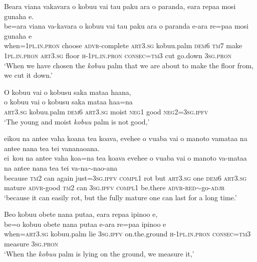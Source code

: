 \ea\label{ex:text15-9}
Beara viana vakavara o kobuu vai tau paku ara o paranda, eara repaa mosi gunaha e.\\
\gll be=ara	viana	va-kavara	o	kobuu	vai	tau	paku	ara	o	paranda	e-ara	re=paa	mosi	gunaha	e\\
     when=1\textsc{pl}.\textsc{in}.\textsc{pron}	choose	\textsc{advr}-complete	\textsc{art}3.\textsc{sg}	kobuu.palm	\textsc{dem}6	\textsc{tm}7	make	1\textsc{pl}.\textsc{in}.\textsc{pron}	\textsc{art}3.\textsc{sg}	floor	\textsc{h}-1\textsc{pl}.\textsc{in}.\textsc{pron}	\textsc{consec}=\textsc{tm}3	cut	go.down	3\textsc{sg}.\textsc{pron}\\
\glt `When we have chosen the \textit{kobuu} palm that we are about to make the floor from, we cut it down.'
\z

\ea\label{ex:text15-10}
O kobuu vai o kobusu saka mataa haana,\\
\gll o	kobuu	vai	o	kobusu	saka	mataa	haa=na\\
     \textsc{art}3.\textsc{sg}	kobuu.palm	\textsc{dem}6	\textsc{art}3.\textsc{sg}	moist	\textsc{neg}1	good	\textsc{neg}2=3\textsc{sg}.\textsc{ipfv}\\
\glt `The young and moist \textit{kobuu} palm is not good,'
\z

\ea\label{ex:text15-11}
eikou na antee vaha koana tea koava, evehee o vuaba vai o manoto vamataa na antee nana tea tei vananaoana.\\
\gll ei~kou	na	antee	vaha	koa=na	tea	koava	evehee	o	vuaba	vai	o	manoto	va-mataa	na	antee	nana	tea	tei	va-na{$\sim$}nao-ana\\
     because	\textsc{tm}2	can	again	just=3\textsc{sg}.\textsc{ipfv}	\textsc{compl}1	rot	but	\textsc{art}3.\textsc{sg}	one	\textsc{dem}6	\textsc{art}3.\textsc{sg}	mature	\textsc{advr}-good	\textsc{tm}2	can	3\textsc{sg}.\textsc{ipfv}	\textsc{compl}1	be.there	\textsc{advr}-\textsc{red}{$\sim$}go-\textsc{adjr}\\
\glt `because it can easily rot, but the fully mature one can last for a long time.'
\z

\ea\label{ex:text15-12}
Beo kobuu obete nana putaa, eara repaa ipinoo e,\\
\gll be=o	kobuu	obete	nana	putaa	e-ara	re=paa	ipinoo	e\\
     when=\textsc{art}3.\textsc{sg}	kobuu.palm	lie	3\textsc{sg}.\textsc{ipfv}	on.the.ground	\textsc{h}-1\textsc{pl}.\textsc{in}.\textsc{pron}	\textsc{consec}=\textsc{tm}3	measure	3\textsc{sg}.\textsc{pron}\\
\glt `When the \textit{kobuu} palm is lying on the ground, we measure it,'
\z

